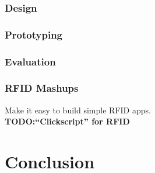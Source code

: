 \documentclass[a4paper,10pt]{report}
\newcommand{\todo}[1]{\\ \textbf{TODO:#1} \\}
\begin{document}
  \subsection{Design}
  \subsection{Prototyping}
  \subsection{Evaluation}
  \subsection{RFID Mashups}
  Make it easy to build simple RFID apps.
  \todo{``Clickscript'' for RFID}

\chapter{Conclusion}


\small

\end{document}
